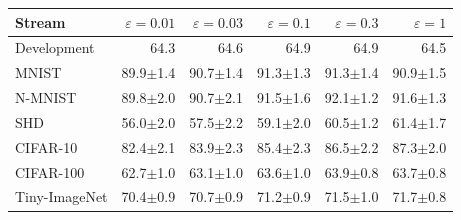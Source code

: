 \begin{tabular*}{\textwidth}{@{\extracolsep{\fill}}lrrrrr@{}}
\toprule
Stream & $\varepsilon=0.01$ & $\varepsilon=0.03$ & $\varepsilon=0.1$ & $\varepsilon=0.3$ & $\varepsilon=1$ \\
\midrule
Development & 64.3 & 64.6 & 64.9 & 64.9 & 64.5 \\
\midrule
MNIST & 89.9$\pm$1.4 & 90.7$\pm$1.4 & 91.3$\pm$1.3 & 91.3$\pm$1.4 & 90.9$\pm$1.5 \\
N-MNIST & 89.8$\pm$2.0 & 90.7$\pm$2.1 & 91.5$\pm$1.6 & 92.1$\pm$1.2 & 91.6$\pm$1.3 \\
SHD & 56.0$\pm$2.0 & 57.5$\pm$2.2 & 59.1$\pm$2.0 & 60.5$\pm$1.2 & 61.4$\pm$1.7 \\
CIFAR-10 & 82.4$\pm$2.1 & 83.9$\pm$2.3 & 85.4$\pm$2.3 & 86.5$\pm$2.2 & 87.3$\pm$2.0 \\
CIFAR-100 & 62.7$\pm$1.0 & 63.1$\pm$1.0 & 63.6$\pm$1.0 & 63.9$\pm$0.8 & 63.7$\pm$0.8 \\
Tiny-ImageNet & 70.4$\pm$0.9 & 70.7$\pm$0.9 & 71.2$\pm$0.9 & 71.5$\pm$1.0 & 71.7$\pm$0.8 \\
\bottomrule
\end{tabular*}
